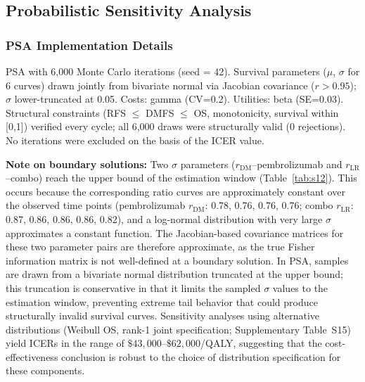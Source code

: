 \documentclass[11pt,a4paper]{article}
\begin{document}
\subsection{Probabilistic Sensitivity Analysis}
\label{sec:psa}

\subsubsection{PSA Implementation Details}
PSA with 6,000 Monte Carlo iterations (seed = 42). Survival parameters ($\mu$, $\sigma$ for 6 curves) drawn jointly from bivariate normal via Jacobian covariance ($r > 0.95$); $\sigma$ lower-truncated at 0.05. Costs: gamma (CV=0.2). Utilities: beta (SE=0.03). Structural constraints (RFS $\leq$ DMFS $\leq$ OS, monotonicity, survival within [0,1]) verified every cycle; all 6,000 draws were structurally valid (0 rejections). No iterations were excluded on the basis of the ICER value.

\noindent\textbf{Note on boundary solutions:} Two $\sigma$ parameters ($r_{\text{DM}}$--pembrolizumab and $r_{\text{LR}}$--combo) reach the upper bound of the estimation window (Table~\ref{tab:s12}). This occurs because the corresponding ratio curves are approximately constant over the observed time points (pembrolizumab $r_{\text{DM}}$: 0.78, 0.76, 0.76, 0.76; combo $r_{\text{LR}}$: 0.87, 0.86, 0.86, 0.86, 0.82), and a log-normal distribution with very large $\sigma$ approximates a constant function. The Jacobian-based covariance matrices for these two parameter pairs are therefore approximate, as the true Fisher information matrix is not well-defined at a boundary solution. In PSA, samples are drawn from a bivariate normal distribution truncated at the upper bound; this truncation is conservative in that it limits the sampled $\sigma$ values to the estimation window, preventing extreme tail behavior that could produce structurally invalid survival curves. Sensitivity analyses using alternative distributions (Weibull OS, rank-1 joint specification; Supplementary Table~S15) yield ICERs in the range of $\$43,000$--$\$62,000$/QALY, suggesting that the cost-effectiveness conclusion is robust to the choice of distribution specification for these components.
\end{document}
